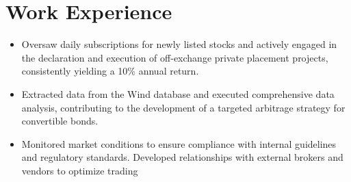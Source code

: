 \documentclass{resume}
\newcommand{\en}[1]{#1}
\newcommand{\zh}[1]{}
\begin{document}
\section{\en{Work Experience}\zh{工作经历}}
\en{}
\zh{\datedsubsection{\textbf{\href{https://zdb.pedaily.cn/enterprise/show102413/}{悬铃资产管理有限公司}}}{12/2021 -- 04/2023}}

\en{}
\zh{\role{全职}{投资组}}

\begin{itemize}
      \item \en{Oversaw daily subscriptions for newly listed stocks and actively engaged in the declaration and execution of off-exchange private 
      placement projects, consistently yielding a 10\% annual return.}
            \zh{场外业务,打新,新股申购,询价转让,定向增发}
      \item \en{Extracted data from the Wind database and executed comprehensive data analysis, contributing to the development of a targeted arbitrage strategy for convertible bonds.}
            \zh{学习如何编写期权定价的python代码}
      \item \en{Monitored market conditions to ensure compliance with internal guidelines and regulatory standards. Developed relationships with external brokers and vendors to optimize trading}
            \zh{学习如何编写期权定价的python代码}
\end{itemize}



\end{document}
